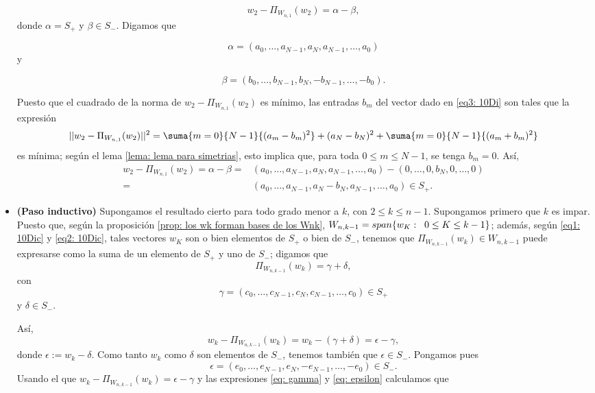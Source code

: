 \begin{itemize}
\[
w_{2}-\Pi_{W_{n,1}}(w_{2})= \alpha - \beta,
\]
donde
$\alpha= S_{+}$ y $\beta \in S_{-}$.
Digamos que 

\begin{equation}
\label{eq2: 10Di}
\alpha = (a_{0}, \ldots , a_{N-1}, a_{N}, a_{N-1}, \ldots , a_{0})
\end{equation}
y 

\begin{equation}
\label{eq3: 10Di}
\beta = (b_{0}, \ldots , b_{N-1}, b_{N}, -b_{N-1}, \ldots , -b_{0}).
\end{equation}

Puesto que el cuadrado de la norma de 
$w_{2}-\Pi_{W_{n,1}}(w_{2})$ es mínimo, las entradas
$b_{m}$ del vector dado en 
\eqref{eq3: 10Di} son tales que la expresión
\begin{equation}
\label{eq6: 9Dic}
|| w_{2}-\Pi_{W_{n,1}}(w_{2}) ||^{2}= 
\suma{m=0}{N-1}{(a_{m}-b_{m})^{2}} + (a_{N}-b_{N})^{2}
+ \suma{m=0}{N-1}{(a_{m}+b_{m})^{2}}
\end{equation}
es mínima; según el lema 
\ref{lema: lema para simetrias}, esto implica que,
para toda $0 \leq m \leq  N-1$,
se tenga $b_{m}=0$.
Así, 
\begin{align*}
w_{2}-\Pi_{W_{n,1}}(w_{2}) =  \alpha - \beta
=  & (a_{0}, \ldots , a_{N-1}, a_{N}, a_{N-1}, \ldots , a_{0})-
(0, \ldots , 0, b_{N}, 0, \ldots ,0 ) \\
= & (a_{0}, \ldots , a_{N-1}, a_{N}-b_{N}, a_{N-1}, \ldots , a_{0}) \in S_{+}.
\end{align*}

\item \textbf{(Paso inductivo)}
Supongamos el resultado cierto para todo grado menor a $k$,
con $2 \leq k \leq n-1$.
Supongamos primero que $k$ es impar. Puesto que,
según la proposición 
\ref{prop: los wk forman bases de los Wnk},
$W_{n,k-1}= span \{ w_{K}: \hspace{0.2cm}
0 \leq K \leq k-1 \}$; además,
según \eqref{eq1: 10Dic} y \eqref{eq2: 10Dic},
tales vectores $w_{K}$ son
o bien elementos de $S_{+}$
o bien de $S_{-}$, tenemos que $\Pi_{W_{n,k-1}}(w_{k}) \in W_{n,k-1}$
puede expresarse como la suma de un elemento de $S_{+}$
y uno de $S_{-}$;
digamos que
\[
\Pi_{W_{n,k-1}}(w_{k}) = \gamma + \delta,
\]
con 
\begin{equation}
\label{eq: gamma}
\gamma = (c_{0}, \ldots , c_{N-1}, c_{N}, c_{N-1}, \ldots , c_{0}) \in S_{+}
\end{equation}
y 
$\delta \in S_{-}$.

Así, 
\[
w_{k} - \Pi_{W_{n,k-1}}(w_{k}) = w_{k} - (\gamma + \delta) = \epsilon - \gamma,
\]
donde $\epsilon := w_{k}-\delta$.
Como tanto $w_{k}$ como $\delta$ son elementos de $S_{-}$, 
tenemos también que
$\epsilon \in S_{-}$. Pongamos pues
\begin{equation}
\label{eq: epsilon}
\epsilon = (e_{0}, \ldots , e_{N-1}, e_{N}, -e_{N-1}, \ldots , -e_{0}) \in S_{-}.
\end{equation}
Usando el que $w_{k}-\Pi_{W_{n,k-1}}(w_{k})= \epsilon - \gamma$
y las expresiones \eqref{eq: gamma} y \eqref{eq: epsilon}
calculamos que 


\end{itemize}
